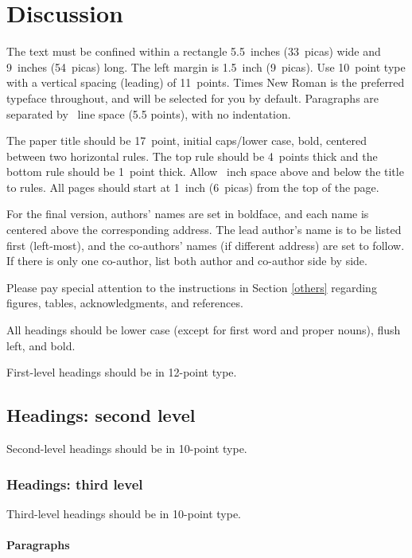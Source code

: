 \documentclass{article}
\begin{document}
\section{Discussion}

The text must be confined within a rectangle 5.5~inches (33~picas) wide and
9~inches (54~picas) long. The left margin is 1.5~inch (9~picas).  Use 10~point
type with a vertical spacing (leading) of 11~points.  Times New Roman is the
preferred typeface throughout, and will be selected for you by default.
Paragraphs are separated by ~line space (5.5 points), with no
indentation.


The paper title should be 17~point, initial caps/lower case, bold, centered
between two horizontal rules. The top rule should be 4~points thick and the
bottom rule should be 1~point thick. Allow ~inch space above and
below the title to rules. All pages should start at 1~inch (6~picas) from the
top of the page.


For the final version, authors' names are set in boldface, and each name is
centered above the corresponding address. The lead author's name is to be listed
first (left-most), and the co-authors' names (if different address) are set to
follow. If there is only one co-author, list both author and co-author side by
side.


Please pay special attention to the instructions in Section \ref{others}
regarding figures, tables, acknowledgments, and references.

\label{headings}


All headings should be lower case (except for first word and proper nouns),
flush left, and bold.


First-level headings should be in 12-point type.


\subsection{Headings: second level}


Second-level headings should be in 10-point type.


\subsubsection{Headings: third level}


Third-level headings should be in 10-point type.


\paragraph{Paragraphs}
\end{document}
